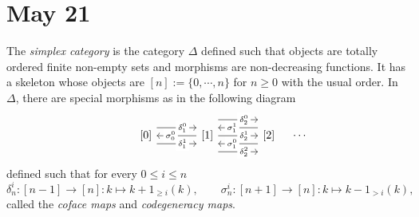 \documentclass{../../../small}
\begin{document}
\title{}
\author{Ikhan Choi}
\maketitle
\tableofcontents

\newpage
\section{May 21}


\begin{prb}
The \emph{simplex category} is the category $\Delta$ defined such that objects are totally ordered finite non-empty sets and morphisms are non-decreasing functions.
It has a skeleton whose objects are $[n]:=\{0,\cdots,n\}$ for $n\ge0$ with the usual order.
In $\Delta$, there are special morphisms as in the following diagram
\[\begin{tikzcd}[sep=large]\,
&{[0]}
\rar["\delta_1^0"description,pos=0.65,shift left=3]
\rar["\delta_1^1"description,pos=0.65,shift right=3]
&{[1]}
\lar["\sigma_0^0"description,pos=0.65]
\rar["\delta_2^0"description,pos=0.65,shift left=6]
\rar["\delta_2^1"description,pos=0.65]
\rar["\delta_2^2"description,pos=0.65,shift right=6]
&{[2]}
\lar["\sigma_1^0"description,pos=0.65,shift left=3]
\lar["\sigma_1^1"description,pos=0.65,shift right=3]
\rar[phantom,"\cdots"]
&\,
\end{tikzcd}\]
defined such that for every $0\le i\le n$
\[\delta_n^i:[n-1]\to[n]:k\mapsto k+1_{\ge i}(k),\qquad\sigma_n^i:[n+1]\to[n]:k\mapsto k-1_{>i}(k),\]
called the \emph{coface maps} and \emph{codegeneracy maps}.


\end{prb}
\end{document}
